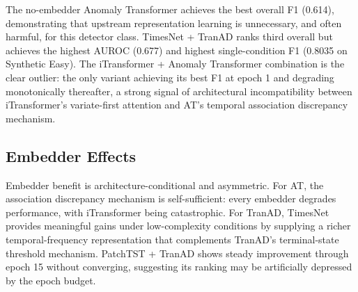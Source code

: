 \documentclass{llncs}
\begin{document}
\begin{table}[t]
\centering
\caption{Cross-model performance at optimal epoch, sorted by F1 descending.}
\label{tab:overall}
\end{table}

The no-embedder Anomaly Transformer achieves the best overall F1 (0.614), demonstrating that upstream representation learning is unnecessary, and often harmful, for this detector class. TimesNet + TranAD ranks third overall but achieves the highest AUROC (0.677) and highest single-condition F1 (0.8035 on Synthetic Easy). The iTransformer + Anomaly Transformer combination is the clear outlier: the only variant achieving its best F1 at epoch 1 and degrading monotonically thereafter, a strong signal of architectural incompatibility between iTransformer's variate-first attention and AT's temporal association discrepancy mechanism.

\subsection{Embedder Effects}

Embedder benefit is architecture-conditional and asymmetric. For AT, the association discrepancy mechanism is self-sufficient: every embedder degrades performance, with iTransformer being catastrophic. For TranAD, TimesNet provides meaningful gains under low-complexity conditions by supplying a richer temporal-frequency representation that complements TranAD's terminal-state threshold mechanism. PatchTST + TranAD shows steady improvement through epoch 15 without converging, suggesting its ranking may be artificially depressed by the epoch budget.
\end{document}
